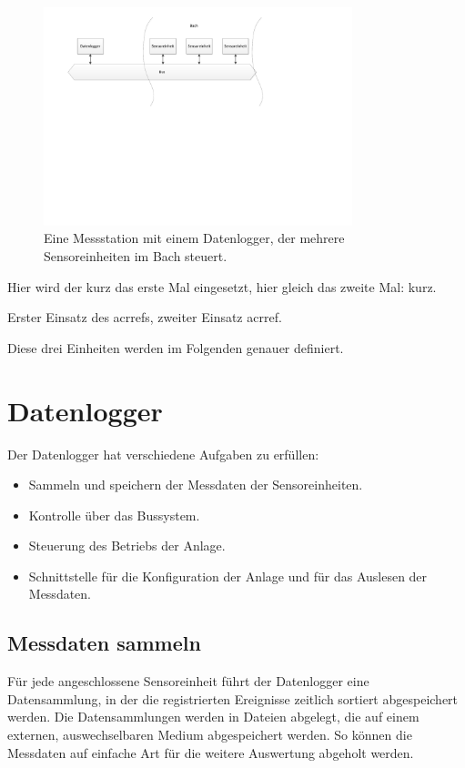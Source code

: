 \begin{figure}[H]
	\centering
		\includegraphics[width=0.8\textwidth]{images/visio/situationskroki.pdf}
	\caption{Eine Messstation mit einem Datenlogger, der mehrere Sensoreinheiten im Bach steuert.}
	\label{fig.situationskroki}
\end{figure}

Hier wird der \gls{kurz} das erste Mal eingesetzt, hier gleich das zweite Mal: \gls{kurz}.



Erster Einsatz des \gls{acrref}s, zweiter Einsatz \gls{acrref}.

Diese drei Einheiten werden im Folgenden genauer definiert.

\section{Datenlogger}
Der Datenlogger hat verschiedene Aufgaben zu erfüllen:
\begin{itemize}
\item Sammeln und speichern der Messdaten der Sensoreinheiten.
\item Kontrolle über das Bussystem.
\item Steuerung des Betriebs der Anlage.
\item Schnittstelle für die Konfiguration der Anlage und für das Auslesen der Messdaten.
\end{itemize}


\subsection{Messdaten sammeln}
Für jede angeschlossene Sensoreinheit führt der Datenlogger eine Datensammlung, in der die registrierten Ereignisse zeitlich sortiert abgespeichert werden. Die Datensammlungen werden in Dateien abgelegt, die auf einem externen, auswechselbaren Medium abgespeichert werden. So können die Messdaten auf einfache Art für die weitere Auswertung abgeholt werden.


